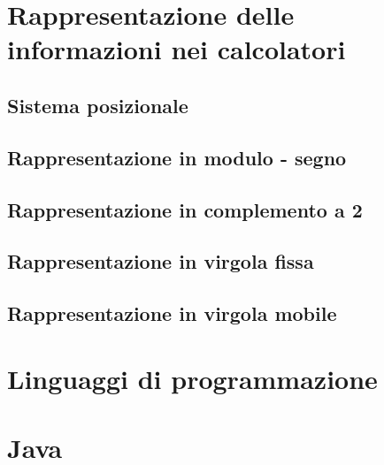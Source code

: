 \documentclass{article}
\begin{document}
\section{Rappresentazione delle informazioni nei calcolatori}
\subsection{Sistema posizionale}
\subsection{Rappresentazione in modulo - segno}
\subsection{Rappresentazione in complemento a 2}
\subsection{Rappresentazione in virgola fissa}
\subsection{Rappresentazione in virgola mobile}

\section{Linguaggi di programmazione}

\section{Java}
\end{document}
